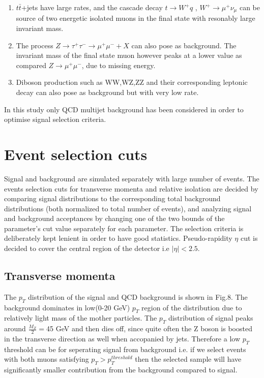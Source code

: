 \documentclass{article}		%
\begin{document}
\begin{enumerate}
								\item $t \bar{t}$+jets have large rates, and the cascade decay $t \to W^+q$ , $W^+ \to \mu^+ \nu_{\mu}$  can be source of two energetic isolated muons in the final state with resonably large invariant mass.
								
								\item The process $Z \to \tau^+\tau^- \to \mu^+\mu^- + X$ can also pose as background. The invariant mass of the final state muon however peaks at a lower value as compared $Z \to \mu^+\mu^-$, due to missing energy.     
								 
								\item Diboson production such as WW,WZ,ZZ and their corresponding leptonic decay can also pose as background but with very low rate.
								   
							\end{enumerate}
							In this study only QCD multijet background has been considered in order to optimise signal selection criteria.		    
									    
 \newpage
\section{Event selection cuts}


Signal and background are simulated separately with large number of events. The events selection cuts for transverse momenta and relative isolation are decided by comparing signal distributions to the corresponding total background distributions (both normalized to total number of events), and analyzing signal and background acceptances by changing one of the two bounds of the parameter's cut value separately for each parameter. The selection criteria is deliberately kept lenient in order to have good statistics. Pseudo-rapidity $\eta$ cut is decided to cover the central region of the detector i.e $|\eta|< 2.5$.    
\subsection{Transverse momenta}   
The $p_T$ distribution of the signal and QCD background is shown in Fig.8. The background dominates in low(0-20 GeV) $p_T$ region of the distribution due to relatively light mass of the mother particles. The $p_T$ distribution of signal peaks around $\frac{M_Z}{2} = $45 GeV and then dies off, since quite often the Z boson is boosted in the transverse direction as well when accopanied by jets. Therefore a low $p_T$ threshold can be for seperating signal from background i.e. if we select events with both muons satisfying $p_T > p_T^{threshold}$ then the selected sample will have significantly smaller contribution from the background compared to signal. 
\end{document}

